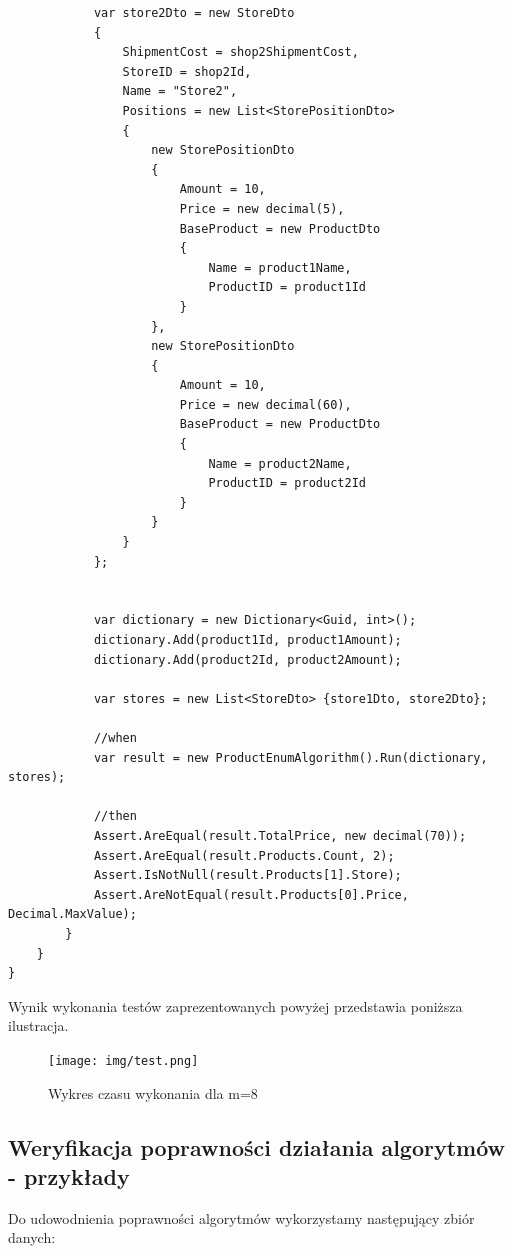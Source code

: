 \documentclass[a4paper]{article}
\begin{document}
\begin{lstlisting}
            var store2Dto = new StoreDto
            {
                ShipmentCost = shop2ShipmentCost,
                StoreID = shop2Id,
                Name = "Store2",
                Positions = new List<StorePositionDto>
                {
                    new StorePositionDto
                    {
                        Amount = 10,
                        Price = new decimal(5),
                        BaseProduct = new ProductDto
                        {
                            Name = product1Name,
                            ProductID = product1Id
                        }
                    },
                    new StorePositionDto
                    {
                        Amount = 10,
                        Price = new decimal(60),
                        BaseProduct = new ProductDto
                        {
                            Name = product2Name,
                            ProductID = product2Id
                        }
                    }
                }
            };


            var dictionary = new Dictionary<Guid, int>();
            dictionary.Add(product1Id, product1Amount);
            dictionary.Add(product2Id, product2Amount);

            var stores = new List<StoreDto> {store1Dto, store2Dto};

            //when
            var result = new ProductEnumAlgorithm().Run(dictionary, stores);

            //then
            Assert.AreEqual(result.TotalPrice, new decimal(70));
            Assert.AreEqual(result.Products.Count, 2);
            Assert.IsNotNull(result.Products[1].Store);
            Assert.AreNotEqual(result.Products[0].Price, Decimal.MaxValue);
        }
    }
}
\end{lstlisting}

Wynik wykonania testów zaprezentowanych powyżej przedstawia poniższa ilustracja.

\begin{figure}[H]
\centering
\texttt{[image: img/test.png]}
\caption{Wykres czasu wykonania dla m=8}
\end{figure}


\subsection{Weryfikacja poprawności działania algorytmów - przykłady}
Do udowodnienia poprawności algorytmów wykorzystamy następujący zbiór danych:
\end{document}
